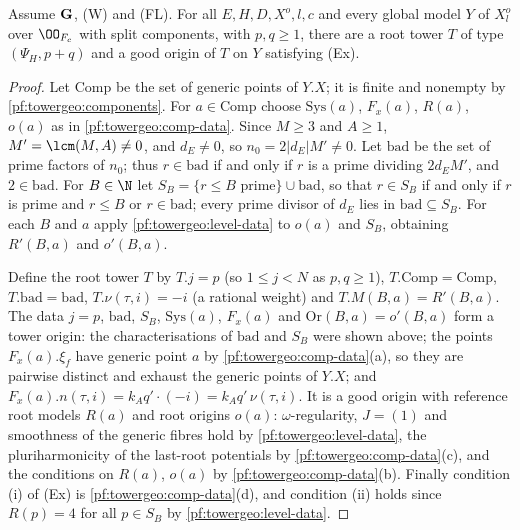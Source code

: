 \begin{theorem}\label{pf:towergeo:exist}
Assume $\mathbf G$, \textup{(W)} and \textup{(FL)}. For all $E,H,D,X^o,l,c$ and every global model $Y$
of $X^o_l$ over $\OO_{F_c}$ with split components, with $p,q\ge1$, there are a root tower $T$ of type
$(\Psi_H,p+q)$ and a good origin of $T$ on $Y$ satisfying \textup{(Ex)}.
\end{theorem}

\begin{proof}
Let $\mathrm{Comp}$ be the set of generic points of $Y.X$; it is finite and nonempty by
\cref{pf:towergeo:components}. For $a\in\mathrm{Comp}$ choose $\mathrm{Sys}(a)$, $F_x(a)$, $R(a)$, $o(a)$ as
in \cref{pf:towergeo:comp-data}. Since $M\ge3$ and $A\ge1$, $M'=\lcm(M,A)\ne0$, and $d_E\ne0$, so
$n_0=2|d_E|M'\ne0$. Let $\mathrm{bad}$ be the set of prime factors of $n_0$; thus $r\in\mathrm{bad}$ if and
only if $r$ is a prime dividing $2d_EM'$, and $2\in\mathrm{bad}$. For $B\in\N$ let
$S_B=\{r\le B\text{ prime}\}\cup\mathrm{bad}$, so that $r\in S_B$ if and only if $r$ is prime and $r\le B$
or $r\in\mathrm{bad}$; every prime divisor of $d_E$ lies in $\mathrm{bad}\subseteq S_B$. For each $B$ and $a$
apply \cref{pf:towergeo:level-data} to $o(a)$ and $S_B$, obtaining $R'(B,a)$ and $o'(B,a)$.

Define the root tower $T$ by $T.j=p$ (so $1\le j<N$ as $p,q\ge1$), $T.\mathrm{Comp}=\mathrm{Comp}$,
$T.\mathrm{bad}=\mathrm{bad}$, $T.\nu(\tau,i)=-i$ (a rational weight) and $T.M(B,a)=R'(B,a)$. The data
$j=p$, $\mathrm{bad}$, $S_B$, $\mathrm{Sys}(a)$, $F_x(a)$ and $\mathrm{Or}(B,a)=o'(B,a)$ form a tower
origin: the characterisations of $\mathrm{bad}$ and $S_B$ were shown above; the points $F_x(a).\xi_f$ have
generic point $a$ by \cref{pf:towergeo:comp-data}(a), so they are pairwise distinct and exhaust the generic
points of $Y.X$; and $F_x(a).n(\tau,i)=k_Aq'\cdot(-i)=k_Aq'\,\nu(\tau,i)$. It is a good origin with reference
root models $R(a)$ and root origins $o(a)$: $\omega$-regularity, $J=(1)$ and smoothness of the generic
fibres hold by \cref{pf:towergeo:level-data}, the pluriharmonicity of the last-root potentials by
\cref{pf:towergeo:comp-data}(c), and the conditions on $R(a)$, $o(a)$ by \cref{pf:towergeo:comp-data}(b).
Finally condition (i) of (Ex) is \cref{pf:towergeo:comp-data}(d), and condition (ii) holds since $R(p)=4$
for all $p\in S_B$ by \cref{pf:towergeo:level-data}.
\end{proof}

